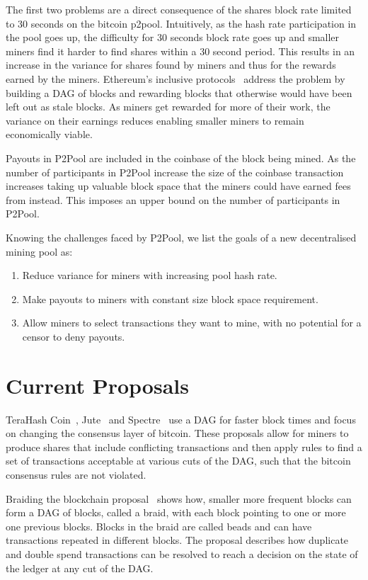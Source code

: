 \documentclass{article}
\begin{document}
The first two problems are a direct consequence of the shares block
rate limited to 30 seconds on the bitcoin p2pool. Intuitively, as the
hash rate participation in the pool goes up, the difficulty for 30
seconds block rate goes up and smaller miners find it harder to find
shares within a 30 second period. This results in an increase in the
variance for shares found by miners and thus for the rewards earned by
the miners. Ethereum's inclusive protocols~\cite{inclusive-protocols}
address the problem by building a DAG of blocks and rewarding blocks
that otherwise would have been left out as stale blocks. As miners get
rewarded for more of their work, the variance on their earnings
reduces enabling smaller miners to remain economically viable.

Payouts in P2Pool are included in the coinbase of the block being
mined. As the number of participants in P2Pool increase the size of
the coinbase transaction increases taking up valuable block space that
the miners could have earned fees from instead. This imposes an upper
bound on the number of participants in P2Pool.

Knowing the challenges faced by P2Pool, we list the goals of a new
decentralised mining pool as:

\begin{enumerate}
\item Reduce variance for miners with increasing pool hash rate.
\item Make payouts to miners with constant size block space
  requirement.
\item Allow miners to select transactions they want to mine, with no
  potential for a censor to deny payouts.
\end{enumerate}

\section{Current Proposals}

TeraHash Coin~\cite{mcelrath:variance}, Jute~\cite{jute} and
Spectre~\cite{spectre} use a DAG for faster block times and focus on
changing the consensus layer of bitcoin. These proposals allow for
miners to produce shares that include conflicting transactions and
then apply rules to find a set of transactions acceptable at various
cuts of the DAG, such that the bitcoin consensus rules are not
violated.

Braiding the blockchain proposal~\cite{mcelrath:variance} shows how,
smaller more frequent blocks can form a DAG of blocks, called a braid,
with each block pointing to one or more one previous blocks. Blocks in
the braid are called beads and can have transactions repeated in
different blocks. The proposal describes how duplicate and double
spend transactions can be resolved to reach a decision on the state of
the ledger at any cut of the DAG.\@
\end{document}

